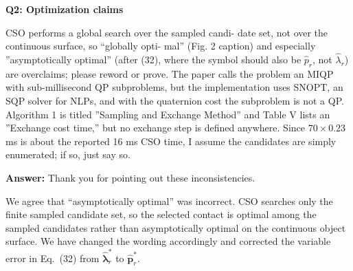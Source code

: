 \documentclass[journal,10pt]{IEEEtran}
\newcommand{\question}[2]{\par\smallskip\noindent
 \color{responseblue}\textbf{Q#1: #2}\par\nobreak\noindent\color{responseblue}}
\newcommand{\answer}{\par\smallskip\noindent\color{black}\textbf{Answer: }\ignorespaces
}
\begin{document}
\question{2}{Optimization claims}

CSO performs a global search over the sampled candi-
date set, not over the continuous surface, so ``globally opti-
mal” (Fig. 2 caption) and especially ”asymptotically optimal”
(after (32), where the symbol should also be $\hat{p}^{}_{r}$, not
$\hat{\lambda}^{}_{r}$) are overclaims; please reword or prove. The
paper calls the problem an MIQP with sub-millisecond QP
subproblems, but the implementation uses SNOPT, an SQP
solver for NLPs, and with the quaternion cost the subproblem
is not a QP. Algorithm 1 is titled ”Sampling and Exchange
Method” and Table V lists an ”Exchange cost time,” but no
exchange step is defined anywhere. Since $70 \times 0.23$ ms is
about the reported 16 ms CSO time, I assume the candidates
are simply enumerated; if so, just say so.

\answer Thank you for pointing out these inconsistencies.

We agree that ``asymptotically optimal'' was incorrect. CSO searches only the finite sampled candidate set, so the selected contact is optimal among the sampled candidates rather than asymptotically optimal on the continuous object surface. We have changed the wording accordingly and corrected the variable error in Eq.~(32) from $\hat{\boldsymbol{\lambda}}_r^*$ to $\hat{\boldsymbol{p}}_r^*$.
\end{document}
